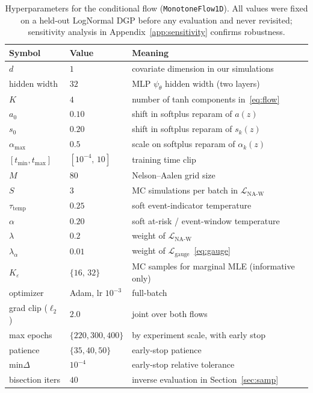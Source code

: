 \begin{table}[t]
\caption{Hyperparameters for the conditional flow (\texttt{MonotoneFlow1D}).
All values were fixed on a held-out LogNormal DGP before any evaluation
and never revisited; sensitivity analysis in
Appendix~\ref{app:sensitivity} confirms robustness.}
\label{tab:hp}
\centering
\small
\begin{tabular}{lll}
\toprule
Symbol & Value & Meaning \\
\midrule
$d$               & $1$ & covariate dimension in our simulations \\
hidden width      & $32$ & MLP $\psi_\theta$ hidden width (two layers) \\
$K$               & $4$ & number of tanh components in~\eqref{eq:flow} \\
$a_0$             & $0.10$ & shift in softplus reparam of $a(z)$ \\
$s_0$             & $0.20$ & shift in softplus reparam of $s_k(z)$ \\
$\alpha_{\max}$   & $0.5$ & scale on softplus reparam of $\alpha_k(z)$ \\
$[t_{\min}, t_{\max}]$ & $[10^{-4},\, 10]$ & training time clip \\
$M$               & $80$ & Nelson--Aalen grid size \\
$S$               & $3$ & MC simulations per batch in $\mathcal{L}_{\text{NA-W}}$ \\
$\tau_{\text{temp}}$ & $0.25$ & soft event-indicator temperature \\
$\alpha$          & $0.20$ & soft at-risk / event-window temperature \\
$\lambda$         & $0.2$ & weight of $\mathcal{L}_{\text{NA-W}}$ \\
$\lambda_\alpha$  & $0.01$ & weight of $\mathcal{L}_{\text{gauge}}$~\eqref{eq:gauge} \\
$K_\varepsilon$   & $\{16,\, 32\}$ & MC samples for marginal MLE (informative only)\\
optimizer         & Adam, lr $10^{-3}$ & full-batch \\
grad clip ($\ell_2$) & $2.0$ & joint over both flows \\
max epochs        & $\{220, 300, 400\}$ & by experiment scale, with early stop \\
patience          & $\{35, 40, 50\}$ & early-stop patience \\
min$\Delta$       & $10^{-4}$ & early-stop relative tolerance \\
bisection iters   & $40$ & inverse evaluation in Section~\ref{sec:samp} \\
\bottomrule
\end{tabular}
\end{table}
